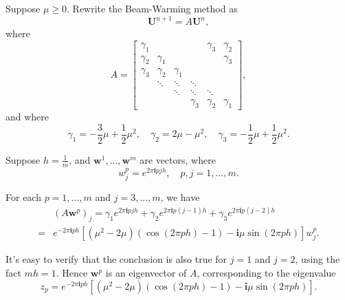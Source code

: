 \documentclass[twocolumn,10pt]{article}
\begin{document}
Suppose $\mu\geq 0$. Rewrite the Beam-Warming method as
\begin{equation*}
    \mathbf{U}^{n+1}=A\mathbf{U}^n,
\end{equation*}
where
\begin{equation*}
    A=\begin{bmatrix}
        \gamma_1 &          &          &          & \gamma_3 & \gamma_2\\
        \gamma_2 & \gamma_1 &          &          &          & \gamma_3\\
        \gamma_3 & \gamma_2 & \gamma_1 & \\
                 & \ddots   & \ddots   & \ddots\\
                 &          & \ddots   & \ddots   & \ddots\\
                 &          &          & \gamma_3 & \gamma_2 & \gamma_1
    \end{bmatrix},
\end{equation*}
and where
\begin{equation*}
    \gamma_1=-\frac{3}{2}\mu+\frac{1}{2}\mu^2,\quad \gamma_2=2\mu-\mu^2,\quad \gamma_3=-\frac{1}{2}\mu+\frac{1}{2}\mu^2.
\end{equation*}

Suppose $h=\frac{1}{m}$, and $\mathbf{w}^1,...,\mathbf{w}^m$ are vectors, where
\begin{equation*}
    w_j^p=e^{2\pi\mathbf{i}pjh},\quad p,j=1,...,m.
\end{equation*}

For each $p=1,...,m$ and $j=3,...,m$, we have
\begin{align*}
    &(A\mathbf{w}^p)_j = \gamma_1e^{2\pi\mathbf{i}pjh} + \gamma_2e^{2\pi\mathbf{i}p(j-1)h} + \gamma_3e^{2\pi\mathbf{i}p(j-2)h}\\
    =& e^{-2\pi\mathbf{i}ph}\left[(\mu^2-2\mu)(\cos(2\pi ph)-1)-\mathbf{i}\mu\sin(2\pi ph)\right]w^p_j.
\end{align*}

It's easy to verify that the conclusion is also true for $j=1$ and $j=2$, using the fact $mh=1$. Hence $\mathbf{w}^p$ is an eigenvector of $A$, corresponding to the eigenvalue
\begin{equation*}
    z_p=e^{-2\pi\mathbf{i}ph}\left[(\mu^2-2\mu)(\cos(2\pi ph)-1)-\mathbf{i}\mu\sin(2\pi ph)\right].
\end{equation*}
\end{document}
